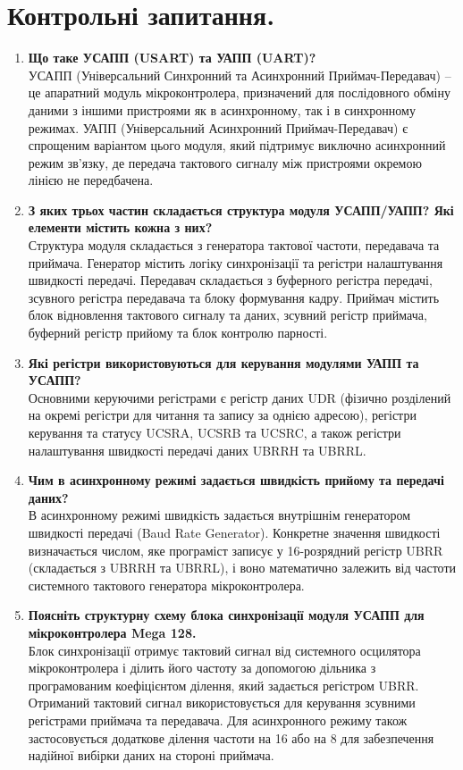 \documentclass[14pt, a4paper]{extreport}
\begin{document}
	\section*{Контрольні запитання.}
	
	\begin{enumerate}
		\item \textbf{Що таке УСАПП (USART) та УАПП (UART)?} \\ УСАПП (Універсальний Синхронний та Асинхронний Приймач-Передавач) -- це апаратний модуль мікроконтролера, призначений для послідовного обміну даними з іншими пристроями як в асинхронному, так і в синхронному режимах. УАПП (Універсальний Асинхронний Приймач-Передавач) є спрощеним варіантом цього модуля, який підтримує виключно асинхронний режим зв'язку, де передача тактового сигналу між пристроями окремою лінією не передбачена.
		
		\item \textbf{З яких трьох частин складається структура модуля УСАПП/УАПП? Які елементи містить кожна з них?} \\ Структура модуля складається з генератора тактової частоти, передавача та приймача. Генератор містить логіку синхронізації та регістри налаштування швидкості передачі. Передавач складається з буферного регістра передачі, зсувного регістра передавача та блоку формування кадру. Приймач містить блок відновлення тактового сигналу та даних, зсувний регістр приймача, буферний регістр прийому та блок контролю парності.
		
		\item \textbf{Які регістри використовуються для керування модулями УАПП та УСАПП?} \\ Основними керуючими регістрами є регістр даних UDR (фізично розділений на окремі регістри для читання та запису за однією адресою), регістри керування та статусу UCSRA, UCSRB та UCSRC, а також регістри налаштування швидкості передачі даних UBRRH та UBRRL.
		
		\item \textbf{Чим в асинхронному режимі задається швидкість прийому та передачі даних?} \\ В асинхронному режимі швидкість задається внутрішнім генератором швидкості передачі (Baud Rate Generator). Конкретне значення швидкості визначається числом, яке програміст записує у 16-розрядний регістр UBRR (складається з UBRRH та UBRRL), і воно математично залежить від частоти системного тактового генератора мікроконтролера.
		
		\item \textbf{Поясніть структурну схему блока синхронізації модуля УСАПП для мікроконтролера Mega 128.} \\ Блок синхронізації отримує тактовий сигнал від системного осцилятора мікроконтролера і ділить його частоту за допомогою дільника з програмованим коефіцієнтом ділення, який задається регістром UBRR. Отриманий тактовий сигнал використовується для керування зсувними регістрами приймача та передавача. Для асинхронного режиму також застосовується додаткове ділення частоти на 16 або на 8 для забезпечення надійної вибірки даних на стороні приймача.
		

\end{enumerate}
\end{document}
